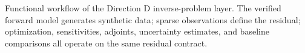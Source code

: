 \caption{Functional workflow of the Direction D inverse-problem layer. The verified forward model generates synthetic data; sparse observations define the residual; optimization, sensitivities, adjoints, uncertainty estimates, and baseline comparisons all operate on the same residual contract.}\label{fig:direction-d-workflow}
